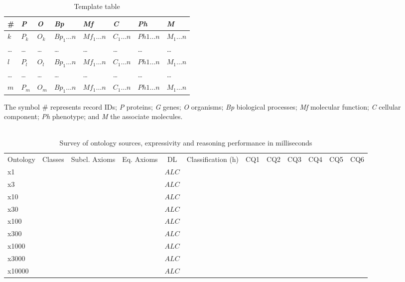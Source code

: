 \documentclass{bmcart}
\begin{document}
\begin{backmatter}
\begin{table}[h!]
	\centering
	\caption{Template table}
	\label{table:template}
	\begin{tabular}{p{0.3in}p{0.3in}p{0.3in}p{0.6in}p{0.6in}p{0.6in}p{0.6in}p{0.6in}} \hline 
		\# & \textit{P} &\textit{O} & \textit{Bp} & \textit{Mf} & \textit{C} & \textit{Ph} & \textit{M} \\ \hline 
		$k$ & $P_k$ & $O_k$ & $Bp_1\ldots n$ & $Mf_1\ldots n$ & $C_1\ldots n$ & $Ph1\ldots n$ & $M_1\ldots n$ \\
		\ldots & \ldots & \ldots & \ldots & \ldots & \ldots & \ldots & \ldots \\
		$l$ & $P_l$ & $O_l$ & $Bp_1\ldots n$ & $Mf_1\ldots n$ & $C_1\ldots n$ & $Ph1\ldots n$ & $M_1\ldots n$ \\
		\ldots & \ldots & \ldots & \ldots & \ldots & \ldots & \ldots & \ldots \\
		$m$ & $P_m$ & $O_m$ & $Bp_1\ldots n$ & $Mf_1\ldots n$ & $C_1\ldots n$ & $Ph1\ldots n$ & $M_1\ldots n$ \\ \hline 
	\end{tabular}
	\begin{tablenotes}
		\item The symbol \# represents record IDs; \textit{P} proteins; \textit{G} genes; \textit{O} organisms; \textit{Bp} biological processes;
		\textit{Mf} molecular function; \textit{C} cellular component; \textit{Ph} phenotype; and \textit{M} the associate molecules. \\ \\
	\end{tablenotes}
\end{table}

\begin{table}[h!]
	\begin{minipage}{\textwidth}
		\label{table:Summary}
		\caption{Survey of ontology sources, expressivity and reasoning performance in milliseconds}
		\centering
		\begin{tabular}{lrrrcrrrrrrr}
			\hline Ontology & Classes & Subcl. Axioms & Eq. Axioms & DL & Classification (h) & CQ1 & CQ2 & CQ3 & CQ4 & CQ5 & CQ6 \\ 
			x1     &   &  &  & $ALC$  &  &  &  &  &  &   &  \\ 
			x3     &   	& &  & $ALC$  &  &  &  &  &   &   &   \\ 
			x10    & 	 &   &  & $ALC$ &  & &  &  &  &  &  \\ 
			x30    &  &  &  & $ALC$ &   &  &  &   &   &  &    \\ 
			x100   &  &  &  & $ALC$ &   &  &  &   &   &  &    \\ 
			x300   &  &  &  & $ALC$ &   &  &  &   &   &  &    \\ 
			x1000  &  &  &  & $ALC$ &   &  &  &   &   &  &    \\ 
			x3000  &  &  &  & $ALC$ &   &  &  &   &   &  &    \\ 
			x10000  &  &  &  & $ALC$ &   &  &  &   &   &  &    \\ 


\end{tabular}
\end{minipage}
\end{table}
\end{backmatter}
\end{document}
